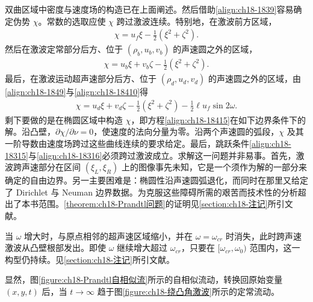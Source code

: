 \documentclass[../../main.tex]{subfiles}
\begin{document}
双曲区域中密度与速度场的构造已在上面阐述。然后借助\eqref{align:ch18-1839}容易确定伪势 $\chi$。常数的选取应使 $\chi$ 跨过激波连续。特别地，在激波前方区域，
\begin{align}
\chi=u_f\xi-\frac12(\xi^2+\zeta^2).
\label{align:ch18-18416}
\end{align}
然后在激波定常部分后方、位于 $(\rho_b,u_b,v_b)$ 的声速圆之外的区域，
\begin{align}
\chi=u_b\xi+v_b\zeta-\frac12(\xi^2+\zeta^2).
\label{align:ch18-18417}
\end{align}
最后，在激波运动超声速部分后方、位于 $(\rho_d,u_d,v_d)$ 的声速圆之外的区域，由\eqref{align:ch18-1849}与\eqref{align:ch18-18410}得
\begin{align}
\chi=u_d\xi+v_d\zeta-\frac12(\xi^2+\zeta^2)-\frac12\ell u_f\sin 2\omega.
\label{align:ch18-18418}
\end{align}
剩下要做的是在椭圆区域中构造 $\chi$，即方程\eqref{align:ch18-18415}在如下边界条件下的解。沿凸壁，$\partial\chi/\partial\nu=0$，使速度的法向分量为零。沿两个声速圆的弧段，$\chi$ 及其一阶导数由速度场跨过这些曲线连续的要求给定。最后，跳跃条件\eqref{align:ch18-18315}与\eqref{align:ch18-18316}必须跨过激波成立。求解这一问题并非易事。首先，激波跨声速部分在区间 $(\xi_L,\xi_R)$ 上的图像事先未知，它是一个须作为解的一部分来确定的自由边界。另一主要困难是：椭圆性沿声速圆弧退化，而同时在那里又给定了 Dirichlet 与 Neuman 边界数据。为克服这些障碍所需的艰苦而技术性的分析超出了本书范围。\cref{theorem:ch18-Prandtl问题}的证明见\cref{section:ch18-注记}所引文献。

当 $\omega$ 增大时，与原点相邻的超声速区域缩小，并在 $\omega=\omega_{cr}$ 时消失，此时跨声速激波从凸壁根部发出。即使 $\omega$ 继续增大超过 $\omega_{cr}$，只要在 $[\omega_{cr},\omega_0)$ 范围内，这一构型仍持续。见\cref{section:ch18-注记}所引文献。

显然，图\cref{figure:ch18-Prandtl自相似流}所示的自相似流动，转换回原始变量 $(x,y,t)$ 后，当 $t\to\infty$ 趋于图\cref{figure:ch18-绕凸角激波}所示的定常流动。
\end{document}
